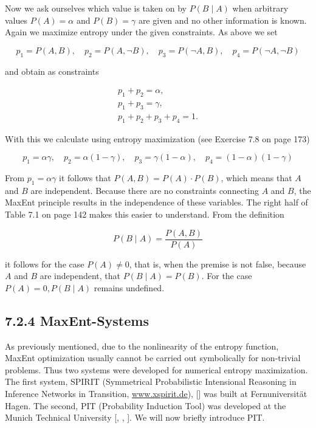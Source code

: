 \documentclass[10pt]{article}
\begin{document}
Now we ask ourselves which value is taken on by $P(B \mid A)$ when arbitrary values $P(A)=\alpha$ and $P(B)=\gamma$ are given and no other information is known. Again we maximize entropy under the given constraints. As above we set

$$
p_{1}=P(A, B), \quad p_{2}=P(A, \neg B), \quad p_{3}=P(\neg A, B), \quad p_{4}=P(\neg A, \neg B)
$$

and obtain as constraints


\begin{gather*}
p_{1}+p_{2}=\alpha,  \tag{7.10}\\
p_{1}+p_{3}=\gamma,  \tag{7.11}\\
p_{1}+p_{2}+p_{3}+p_{4}=1 . \tag{7.12}
\end{gather*}


With this we calculate using entropy maximization (see Exercise 7.8 on page 173)

$$
p_{1}=\alpha \gamma, \quad p_{2}=\alpha(1-\gamma), \quad p_{3}=\gamma(1-\alpha), \quad p_{4}=(1-\alpha)(1-\gamma)
$$

From $p_{1}=\alpha \gamma$ it follows that $P(A, B)=P(A) \cdot P(B)$, which means that $A$ and $B$ are independent. Because there are no constraints connecting $A$ and $B$, the MaxEnt principle results in the independence of these variables. The right half of Table 7.1 on page 142 makes this easier to understand. From the definition

$$
P(B \mid A)=\frac{P(A, B)}{P(A)}
$$

it follows for the case $P(A) \neq 0$, that is, when the premise is not false, because $A$ and $B$ are independent, that $P(B \mid A)=P(B)$. For the case $P(A)=0, P(B \mid A)$ remains undefined.

\subsection*{7.2.4 MaxEnt-Systems}
As previously mentioned, due to the nonlinearity of the entropy function, MaxEnt optimization usually cannot be carried out symbolically for non-trivial problems. Thus two systems were developed for numerical entropy maximization. The first system, SPIRIT (Symmetrical Probabilistic Intensional Reasoning in Inference Networks in Transition, \href{http://www.xspirit.de}{www.xspirit.de}), [\cite{rodder1996spirit}] was built at Fernuniversität Hagen. The second, PIT (Probability Induction Tool) was developed at the Munich Technical University [\cite{schramm1996indifferenz}, \cite{ertel1999combining}, \cite{schramm2000reasoning}]. We will now briefly introduce PIT.
\end{document}
